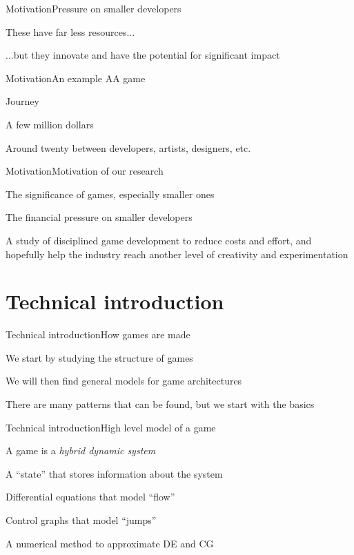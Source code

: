 \documentclass{beamer}
\begin{document}
\begin{slide}{Motivation}{Pressure on smaller developers}{
\item These have far less resources...
\item ...but they innovate and have the potential for significant impact
}\end{slide}

\begin{slide}{Motivation}{An example AA game}{
\item Journey
\item A few million dollars
\item Around twenty between developers, artists, designers, etc.
}\end{slide}

\begin{slide}{Motivation}{Motivation of our research}{
\item The significance of games, especially smaller ones
\item The financial pressure on smaller developers
\item A study of disciplined game development to reduce costs and effort, and hopefully help the industry reach another level of creativity and experimentation
}\end{slide}

\section{Technical introduction}
\begin{slide}{Technical introduction}{How games are made}{
\item We start by studying the structure of games
\item We will then find general models for game architectures
\item There are many patterns that can be found, but we start with the basics
}\end{slide}

\begin{slide}{Technical introduction}{High level model of a game}{
\item A game is a \textit{hybrid dynamic system}
\item A ``state'' that stores information about the system
\item Differential equations that model ``flow''
\item Control graphs that model ``jumps''
\item A numerical method to approximate DE and CG
}\end{slide}
\end{document}
